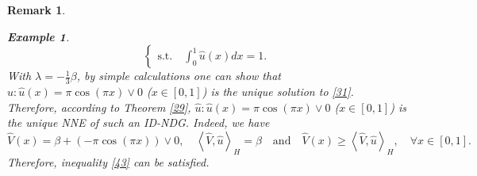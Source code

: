 \documentclass[10pt]{article}
\newtheorem{remark}{Remark}[section]
\newtheorem{example}{Example}[section]
\begin{document}
\begin{remark}
\begin{example}
\begin{equation}
\begin{cases}
\mbox{s.t.}\quad \int_0^1 \widehat{u}(x)dx=1.
   \end{cases}
 \end{equation}
With $\lambda=-\frac{1}{3}\beta$, by simple calculations one can show that $\widehat{u}:\widehat{u}(x)=\pi\cos(\pi x)\vee0$ ($x\in[0,1]$) is the unique solution to \eqref{31}. Therefore, according to Theorem \ref{29}, $\widehat{u}:\widehat{u}(x)=\pi\cos(\pi x)\vee0$ ($x\in[0,1]$)  is the unique NNE  of such an ID-NDG.
Indeed, we have
 $$
 \widehat{V}(x)=\beta+(-\pi\cos(\pi x))\vee0,\quad\left\langle \widehat{V},\widehat{u}\right\rangle_H=\beta\quad\mbox{and}\quad\widehat{V}(x)\geq \left\langle \widehat{V},\widehat{u}\right\rangle_H,\quad \forall x\in[0,1].
 $$
Therefore, inequality \eqref{43} can be satisfied.
\end{example}
\end{remark}
\end{document}
